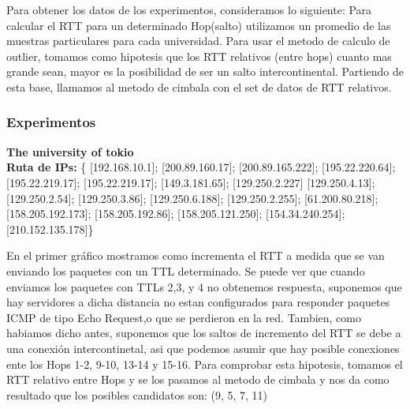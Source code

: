 Para obtener los datos de los experimentos, consideramos lo siguiente:
Para calcular el RTT para un determinado Hop(salto) utilizamos un promedio de las muestras particulares para cada universidad.
Para usar el metodo de calculo de outlier, tomamos como hipotesis que los RTT relativos (entre hops) cuanto mas grande sean, mayor es la posibilidad de ser un salto intercontinental. Partiendo de esta base, llamamos al metodo de cimbala con el set de datos de RTT relativos.

\subsubsection{Experimentos}
\textbf{The university of tokio} \\

\textbf{Ruta de IPs:} \{ [192.168.10.1]; [200.89.160.17]; [200.89.165.222];
 [195.22.220.64]; [195.22.219.17]; [195.22.219.17]; [149.3.181.65]; [129.250.2.227]
 [129.250.4.13]; [129.250.2.54]; [129.250.3.86]; [129.250.6.188]; [129.250.2.255];
 [61.200.80.218]; [158.205.192.173]; [158.205.192.86]; [158.205.121.250];
 [154.34.240.254]; [210.152.135.178]\}

En el primer gráfico mostramos como incrementa el RTT a medida que se van enviando los paquetes con un TTL determinado. Se puede ver que cuando enviamos los paquetes con TTLs 2,3, y 4 no obtenemos respuesta, suponemos que hay servidores a dicha distancia no estan configurados para responder paquetes ICMP de tipo Echo Request,o que se perdieron en la red. Tambien, como habiamos dicho antes, suponemos que los saltos de incremento del RTT se debe a una conexión intercontinetal, asi que podemos asumir que hay posible conexiones ente los Hops 1-2, 9-10, 13-14 y 15-16.
Para comprobar esta hipotesis, tomamos el RTT relativo entre Hops y se los pasamos al metodo de cimbala y nos da como resultado que los posibles candidatos son:
(9, 5, 7, 11)


